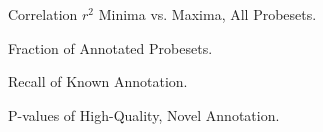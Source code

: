 \documentclass{article}
\begin{document}
\begin{figure}[htbp]
\label{figure:cor_minmax}
\caption{Correlation $r^2$ Minima vs. Maxima, All Probesets.}
\end{figure}

\begin{figure}[htbp]
\label{figure:bp_annot}
\caption{Fraction of Annotated Probesets.}
\end{figure}

\begin{figure}[htbp]
\label{figure:bp_recall}
\caption{Recall of Known Annotation.}
\end{figure}

\begin{figure}[htbp]
\label{figure:bp_novel}
\caption{P-values of High-Quality, Novel Annotation.}
\end{figure}
\end{document}
